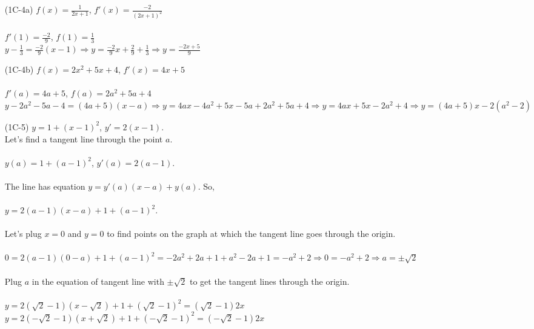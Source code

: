 \documentclass{article}
\begin{document}
\begin{itemize}
\item[(1C-4a)] $f(x) = \frac{1}{2x+1}$, $f'(x) = \frac{-2}{(2x+1)^2}$ \\ \\ 
$f'(1) = \frac{-2}{9}$, $f(1) = \frac{1}{3}$ \\

$y - \frac{1}{3} = \frac{-2}{9}(x-1) \Rightarrow 
y = \frac{-2}{9}x + \frac{2}{9} + \frac{1}{3} \Rightarrow
y = \frac{-2x+5}{9}$

\item[(1C-4b)]
$f(x) = 2x^2+5x+4$, $f'(x) = 4x+5$ \\ \\ 
$f'(a) = 4a+5$, $f(a) = 2a^2+5a+4$ \\

$y - 2a^2-5a-4 = (4a+5)(x-a) \Rightarrow 
y = 4ax-4a^2+5x-5a+2a^2+5a+4 \Rightarrow
y = 4ax+5x-2a^2+4 \Rightarrow y = (4a+5)x-2(a^2-2)$
\item[(1C-5)]
$y = 1 + (x - 1)^2$, $y' = 2(x-1)$. \\
Let's find a tangent line through the point $a$. \\ \\
$y(a) = 1 + (a - 1)^2$, $y'(a) = 2(a - 1)$. \\ \\
The line has equation $y = y'(a)(x-a) + y(a)$. So,\\ \\
$y = 2(a-1)(x-a)+1+(a-1)^2$. \\ \\
Let's plug $x = 0$ and $y = 0$ to find points on the graph at which the tangent line goes through the origin.\\ \\
$0 = 2(a-1)(0-a)+1+(a-1)^2 = -2a^2+2a+1+a^2-2a+1 = -a^2+2 \Rightarrow 0 =-a^2+2 \Rightarrow a = \pm \sqrt{2}$
\\ \\
Plug $a$ in the equation of tangent line with $\pm \sqrt{2}$ to get the tangent lines through the origin. \\ \\
$y = 2(\sqrt{2}-1)(x-\sqrt{2})+1+(\sqrt{2}-1)^2 = (\sqrt{2}-1)2x$ \\

$y = 2(-\sqrt{2}-1)(x+\sqrt{2})+1+(-\sqrt{2}-1)^2 = (-\sqrt{2}-1)2x$


\end{itemize}
\end{document}
